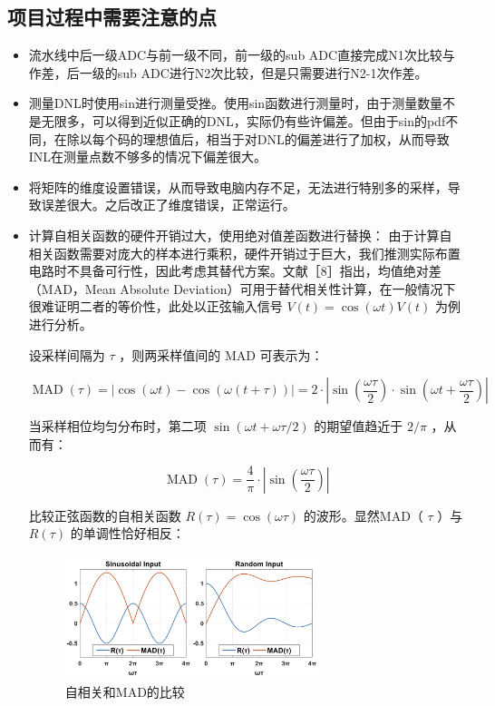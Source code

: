 \documentclass[cs4size,a4paper]{ctexart}
\numberwithin{equation}{section}
\numberwithin{table}{section}
\numberwithin{figure}{section}
\begin{document}
		\subsection{项目过程中需要注意的点}
		\begin{itemize}
			\item 流水线中后一级ADC与前一级不同，前一级的sub ADC直接完成N1次比较与作差，后一级的sub ADC进行N2次比较，但是只需要进行N2-1次作差。
			
			\item 测量DNL时使用sin进行测量受挫。使用sin函数进行测量时，由于测量数量不是无限多，可以得到近似正确的DNL，实际仍有些许偏差。但由于sin的pdf不同，在除以每个码的理想值后，相当于对DNL的偏差进行了加权，从而导致INL在测量点数不够多的情况下偏差很大。
			
			\item 将矩阵的维度设置错误，从而导致电脑内存不足，无法进行特别多的采样，导致误差很大。之后改正了维度错误，正常运行。
			
			\item 计算自相关函数的硬件开销过大，使用绝对值差函数进行替换：
			由于计算自相关函数需要对庞大的样本进行乘积，硬件开销过于巨大，我们推测实际布置电路时不具备可行性，因此考虑其替代方案。文献［8］指出，均值绝对差（MAD，Mean Absolute Deviation）可用于替代相关性计算，在一般情况下很难证明二者的等价性，此处以正弦输入信号 $V(t)=\cos (\omega t) V(t)$ 为例进行分析。
			
			设采样间隔为 $\tau$ ，则两采样值间的 MAD 可表示为：
			
			$$
			\operatorname{MAD}(\tau)=|\cos (\omega t)-\cos (\omega(t+\tau))|=2 \cdot\left|\sin \left(\frac{\omega \tau}{2}\right) \cdot \sin \left(\omega t+\frac{\omega \tau}{2}\right)\right|
			$$
			
			
			当采样相位均匀分布时，第二项 $\sin (\omega t+\omega \tau / 2)$ 的期望值趋近于 $2 / \pi$ ，从而有：
			
			$$
			\operatorname{MAD}(\tau)=\frac{4}{\pi} \cdot\left|\sin \left(\frac{\omega \tau}{2}\right)\right|
			$$
			
			
			比较正弦函数的自相关函数 $R(\tau)=\cos (\omega \tau)$ 的波形。显然MAD（ $\tau$ ）与 $R(\tau)$ 的单调性恰好相反：
			
			\begin{figure}[H]
				\centering
				\includegraphics[width=0.7\textwidth]{figure/feeling1.png}
				\caption{自相关和MAD的比较} 
				\label{fig:feeling1}
			\end{figure}
			

\end{itemize}
\end{document}
